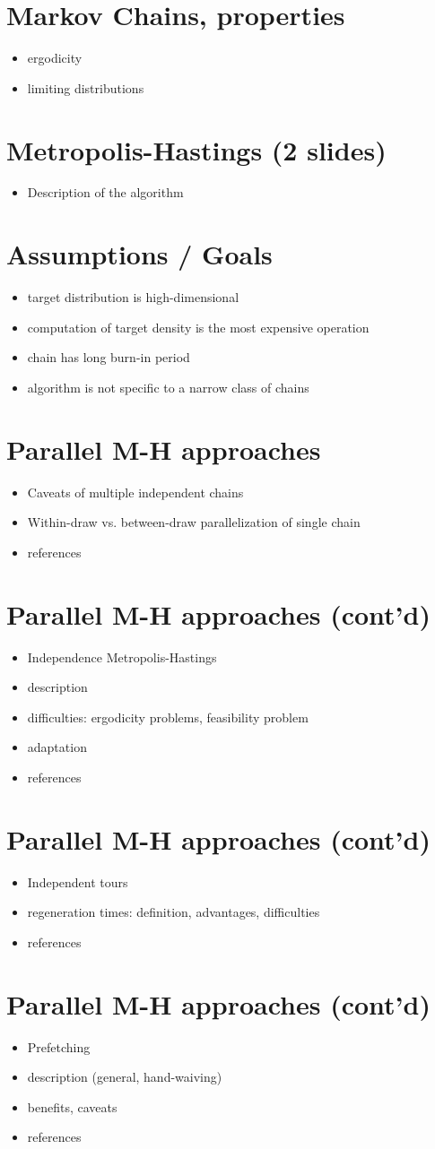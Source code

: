 \documentclass[11pt]{article}       %
\newenvironment{slide}[1]        {\section{#1} \begin{itemize}}%
                                 {\end{itemize}}
\begin{document}
\begin{slide}{Markov Chains, properties}
\item ergodicity
\item limiting distributions
\end{slide} 

\begin{slide}{Metropolis-Hastings (2 slides)}
\item Description of the algorithm
\end{slide}

\begin{slide}{Assumptions / Goals}
\item target distribution is high-dimensional 
\item computation of target density is the most expensive operation
\item chain has long burn-in period
\item algorithm is not specific to a narrow class of chains
\end{slide}

\begin{slide}{Parallel M-H approaches}
\item Caveats of multiple independent chains
\item Within-draw vs. between-draw parallelization of single chain
\item references
\end{slide}

\begin{slide}{Parallel M-H approaches (cont'd)}
\item Independence Metropolis-Hastings
\item description
\item difficulties: ergodicity problems, feasibility problem
\item adaptation
\item references
\end{slide}

\begin{slide}{Parallel M-H approaches (cont'd)}
\item Independent tours
\item regeneration times: definition, advantages, difficulties
\item references
\end{slide}

\begin{slide}{Parallel M-H approaches (cont'd)}
\item Prefetching
\item description (general, hand-waiving)
\item benefits, caveats 
\item references
\end{slide}
\end{document}
